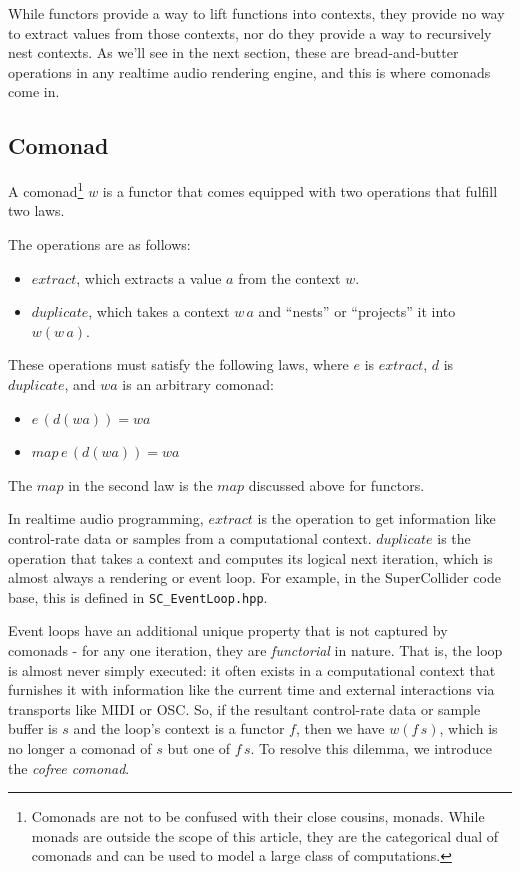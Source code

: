 \documentclass{article}
\begin{document}
While functors provide a way to lift functions into contexts, they provide no way to extract values from those contexts, nor do they provide a way to recursively nest contexts. As we'll see in the next section, these are bread-and-butter operations in any realtime audio rendering engine, and this is where comonads come in.

\subsection{Comonad}

A comonad\footnote{Comonads are not to be confused with their close cousins, monads. While monads are outside the scope of this article, they are the categorical dual of comonads and can be used to model a large class of computations.} $w$ is a functor that comes equipped with two operations that fulfill two laws.

The operations are as follows:

\begin{itemize}
  \item $extract$, which extracts a value $a$ from the context $w$.
  \item $duplicate$, which takes a context $w\,a$ and ``nests'' or ``projects'' it into $w(w\,a)$.
\end{itemize}

These operations must satisfy the following laws, where $e$ is $extract$, $d$ is $duplicate$, and $wa$ is an arbitrary comonad:

\begin{itemize}
  \item $e\,(d (wa)) = wa$
  \item $map\,e\,(d (wa)) = wa$
\end{itemize}

The $map$ in the second law is the $map$ discussed above for functors.

In realtime audio programming, $extract$ is the operation to get information like control-rate data or samples from a computational context. $duplicate$ is the operation that takes a context and computes its logical next iteration, which is almost always a rendering or event loop. For example, in the SuperCollider code base, this is defined in \texttt{SC\_EventLoop.hpp}.

Event loops have an additional unique property that is not captured by comonads - for any one iteration, they are \textit{functorial} in nature. That is, the loop is almost never simply executed: it often exists in a computational context that furnishes it with information like the current time and external interactions via transports like MIDI or OSC. So, if the resultant control-rate data or sample buffer is $s$ and the loop's context is a functor $f$, then we have $w (f\,s)$, which is no longer a comonad of $s$ but one of $f\,s$. To resolve this dilemma, we introduce the \textit{cofree comonad}.
\end{document}
